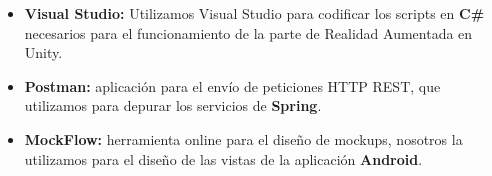 \begin{itemize}
    \item \textbf{Visual Studio:} Utilizamos Visual Studio para codificar los scripts en \textbf{C\#} necesarios para el funcionamiento de la parte de Realidad Aumentada en Unity.
    \item \textbf{Postman:} aplicación para el envío de peticiones HTTP REST, que utilizamos para depurar los servicios de \textbf{Spring}.
    \item \textbf{MockFlow:} herramienta online para el diseño de mockups, nosotros la utilizamos para el diseño de las vistas de la aplicación \textbf{Android}.
\end{itemize}
